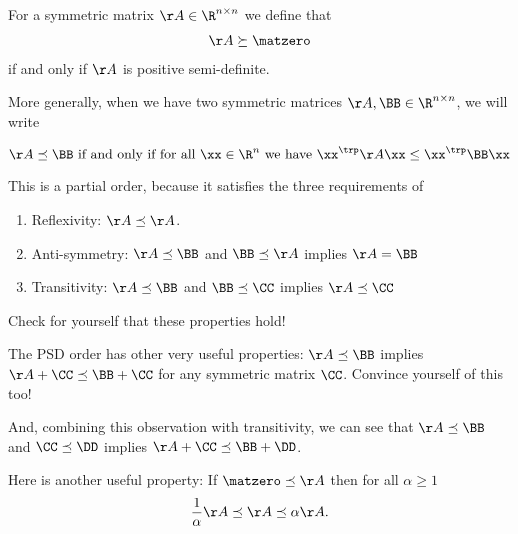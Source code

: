 For a symmetric matrix $\AA \in \R^{n \times n}$ we define that
\begin{align*}
\AA \succeq \matzero
\end{align*}
if and only if $\AA$ is positive semi-definite.

More generally, when we have two symmetric matrices $\AA, \BB \in
\R^{n \times n}$, we will write

\begin{equation}
  \label{eq:psdorder}
  \AA \preceq \BB
  \text{ if and only if for all } \xx \in \R^n
  \text{ we have } \xx^{\trp} \AA \xx \leq \xx^{\trp} \BB
  \xx
\end{equation}

This is a partial order, because it satisfies the three requirements
of
\begin{enumerate}
\item Reflexivity: $\AA \preceq \AA$.
\item Anti-symmetry:
  $\AA \preceq \BB$ and $\BB \preceq \AA$
  implies $\AA = \BB$
\item Transitivity:    $\AA \preceq \BB$ and $\BB \preceq \CC$
  implies $\AA \preceq \CC$
\end{enumerate}
Check for yourself that these properties hold!

The PSD order has other very useful properties:
$\AA \preceq \BB$ implies $\AA + \CC \preceq \BB + \CC$ for any
symmetric matrix $\CC$. Convince yourself of this too!

And, combining this observation with transitivity, we can see that
$\AA \preceq \BB$  and $\CC\preceq \DD$
implies ${\AA + \CC \preceq \BB + \DD}$.

Here is another useful property: If $\matzero \preceq \AA$ then for all $\alpha \geq 1$
\[
 \frac{1}{\alpha} \AA \preceq \AA \preceq \alpha \AA.
\]

